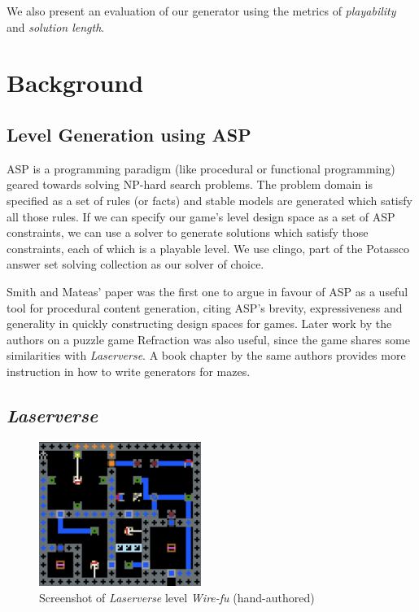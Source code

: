 \documentclass[letterpaper]{article}
\begin{document}
We also present an evaluation of our generator using the metrics of \textit{playability} and \textit{solution length}.

\section{Background}

\subsection{Level Generation using ASP}
ASP is a programming paradigm (like procedural or functional programming) geared towards solving NP-hard search
problems. The problem domain is specified as a set of rules (or facts) and stable models are generated which satisfy all
those rules. If we can specify our game's level design space as a set of ASP constraints, we can use a solver to
generate solutions which satisfy those constraints, each of which is a playable level. We use clingo, part of the
Potassco answer set solving collection \cite{gebser2011potassco} as our solver of choice.

Smith and Mateas' paper \cite{smith2011answer} was the first one to argue in favour of ASP as a useful tool for
procedural content generation, citing ASP's brevity, expressiveness and generality in quickly constructing design spaces
for games. Later work by the authors on a puzzle game Refraction \cite{smith2012case} was also useful, since the game
shares some similarities with \textit{Laserverse}. A book chapter by the same authors \cite{nelson2016asp} provides more
instruction in how to write generators for mazes.

\subsection{\textit{Laserverse}}

\begin{figure}
    \centering
    \includegraphics[width=0.47\textwidth]{img/wirefu.png}
    \caption{Screenshot of \textit{Laserverse} level \textit{Wire-fu} (hand-authored)}
    \label{fig:wirefu}
\end{figure}
\end{document}
